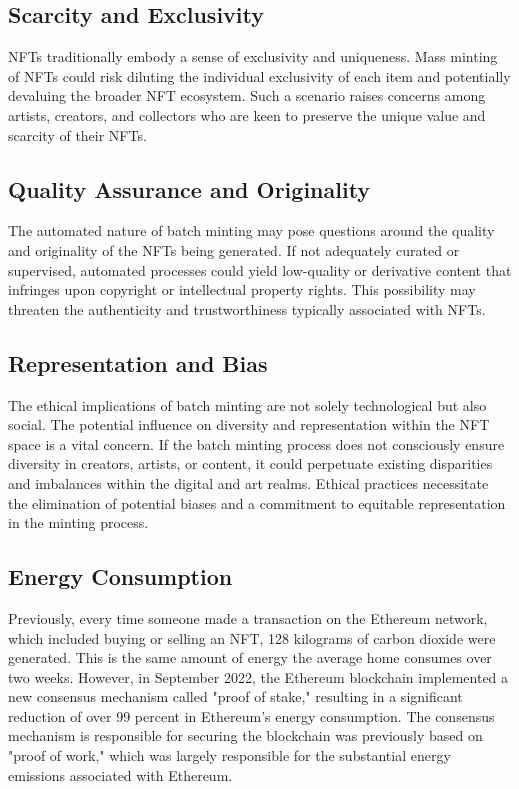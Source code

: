\documentclass[10pt,twocolumn]{article}
\begin{document}
\subsection{Scarcity and Exclusivity} 
NFTs traditionally embody a sense of exclusivity and uniqueness. Mass minting of NFTs could risk diluting the individual exclusivity of each item and potentially devaluing the broader NFT ecosystem. Such a scenario raises concerns among artists, creators, and collectors who are keen to preserve the unique value and scarcity of their NFTs.

\subsection{Quality Assurance and Originality}
 The automated nature of batch minting may pose questions around the quality and originality of the NFTs being generated. If not adequately curated or supervised, automated processes could yield low-quality or derivative content that infringes upon copyright or intellectual property rights. This possibility may threaten the authenticity and trustworthiness typically associated with NFTs.

\subsection{Representation and Bias}
The ethical implications of batch minting are not solely technological but also social. The potential influence on diversity and representation within the NFT space is a vital concern. If the batch minting process does not consciously ensure diversity in creators, artists, or content, it could perpetuate existing disparities and imbalances within the digital and art realms. Ethical practices necessitate the elimination of potential biases and a commitment to equitable representation in the minting process.

\subsection{Energy Consumption}
Previously, every time someone made a transaction on the Ethereum network, which included buying or selling an NFT, 128 kilograms of carbon dioxide were generated. This is the same amount of energy the average home consumes over two weeks.\cite{nftrisk} However, in September 2022, the Ethereum blockchain implemented a new consensus mechanism called "proof of stake," resulting in a significant reduction of over 99 percent in Ethereum's energy consumption. The consensus mechanism is responsible for securing the blockchain was previously based on "proof of work," which was largely responsible for the substantial energy emissions associated with Ethereum.
\end{document}
